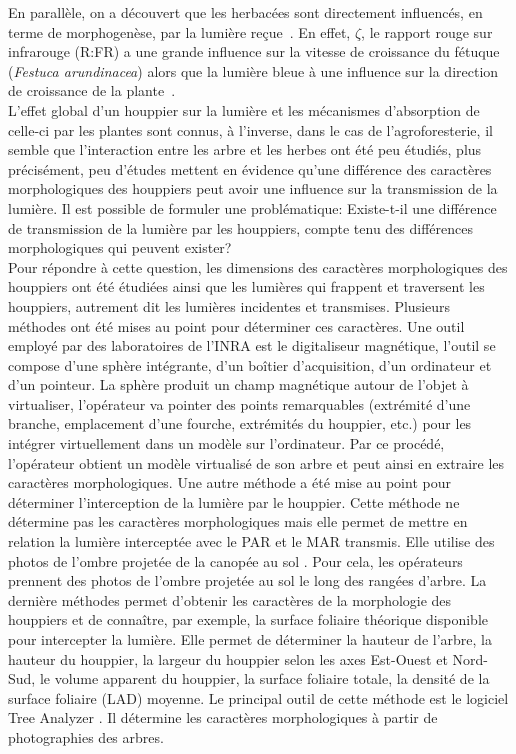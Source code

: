 \documentclass[12pt]{report}
\newcommand\indexp[1]{#1\index{#1}}
\begin{document}
En parallèle, on a découvert que les herbacées sont directement influencés, en
terme de morphogenèse, par la lumière reçue~\citep{MAR_ref16}. En effet,\indexp{ $\zeta$},
le rapport rouge sur infrarouge (R:FR) a une grande influence sur la vitesse de
croissance du fétuque (\textit{Festuca arundinacea}) alors que la lumière bleue
à une influence sur la direction de croissance de la plante~\citep{BioVeg_ref43}.\\

L'effet global d'un houppier sur la lumière et les mécanismes d'absorption de
celle-ci par les plantes sont connus, à l'inverse, dans le cas de
l'agroforesterie, il semble que l'interaction entre les arbre et les herbes ont
été peu étudiés, plus précisément, peu d'études mettent en évidence qu'une
différence des caractères morphologiques des houppiers peut avoir une influence sur
la transmission de la lumière. Il est possible de formuler une
problématique: Existe-t-il une différence de transmission de la lumière par les
houppiers, compte tenu des différences morphologiques qui peuvent exister?\\

Pour répondre à cette question, les dimensions des caractères morphologiques des
houppiers ont été étudiées ainsi que les lumières qui frappent et traversent les
houppiers, autrement dit les
lumières incidentes et transmises. Plusieurs méthodes ont été mises au
point pour déterminer ces caractères. Une outil employé par des laboratoires de
l'INRA est le digitaliseur magnétique, l'outil se compose d'une sphère
intégrante, d'un boîtier d'acquisition, d'un ordinateur et d'un pointeur. La
sphère produit un champ magnétique autour de l'objet à virtualiser, l'opérateur
va pointer des points remarquables (extrémité d'une branche, emplacement d'une
fourche, extrémités du houppier, etc.) pour les intégrer virtuellement dans un
modèle sur l'ordinateur. Par ce procédé, l'opérateur obtient un modèle
virtualisé de son arbre et peut ainsi en extraire les caractères morphologiques.
Une autre méthode a été mise au point pour déterminer l'interception de la lumière par
le houppier. Cette méthode ne détermine pas les caractères
morphologiques mais elle permet de mettre en relation la lumière interceptée avec
le PAR et le MAR transmis. Elle utilise des photos de l'ombre projetée de la canopée au
sol \citep{MAR_ref32}. Pour cela, les opérateurs prennent des photos de l'ombre
projetée au sol le long des rangées d'arbre. La dernière méthodes permet
d'obtenir les caractères de la morphologie des houppiers et de connaître, par
exemple, la surface foliaire théorique disponible pour intercepter la lumière.
Elle permet de déterminer la hauteur de l'arbre, la hauteur du houppier, la
largeur du houppier selon les axes Est-Ouest et Nord-Sud, le volume apparent du
houppier, la surface foliaire totale, la densité de la surface foliaire (LAD)
moyenne. Le principal outil de cette méthode est le logiciel Tree Analyzer
\citep{MAR_ref24,MAR_ref25}. Il détermine les caractères morphologiques à
partir de photographies des arbres.
\end{document}
